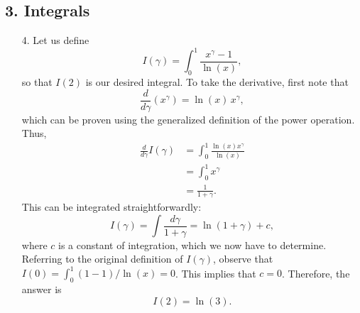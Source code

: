 \documentclass[10pt,a4paper]{article}
\begin{document}
\subsection*{3. Integrals}

\begin{enumerate}
\item[4.]
Let us define
\begin{equation}
  I(\gamma) = \int_0^1 \frac{x^\gamma - 1}{\ln(x)},
\end{equation}
so that $I(2)$ is our desired integral. To take the derivative, first
note that
\begin{equation}
  \frac{d}{d\gamma}(x^\gamma) = \ln(x)\,
  x^\gamma,
\end{equation}
which can be proven using the generalized definition of the power
operation. Thus,
\begin{align}
  \frac{d}{d\gamma} I(\gamma) &= \int_0^1 \frac{\ln(x) x^\gamma}{\ln(x)} \\
  &= \int_0^1 x^\gamma \\
  &= \frac{1}{1+\gamma}.
\end{align}
This can be integrated straightforwardly:
\begin{equation}
  I(\gamma) = \int \frac{d\gamma}{1+\gamma} = \ln(1+\gamma) + c,
\end{equation}
where $c$ is a constant of integration, which we now have to
determine.  Referring to the original definition of $I(\gamma)$,
observe that $I(0) = \int_0^1 (1 - 1)/\ln(x) = 0$. This implies that
$c = 0$.  Therefore, the answer is
\begin{equation}
  I(2) = \ln(3).
\end{equation}


\end{enumerate}
\end{document}
